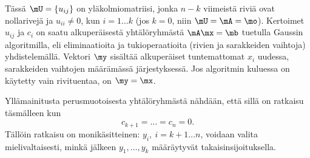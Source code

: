 Tässä $\mU=\{u_{ij}\}$ on yläkolmiomatriisi, jonka $n-k$ viimeistä riviä ovat nollarivejä ja 
$u_{ii} \neq 0$, kun $i=1 \ldots k$ (jos $k=0$, niin $\mU=\mA=\mo$). Kertoimet $u_{ij}$ ja $c_i$
on saatu alkuperäisestä  yhtälöryhmästä $\mA \mx = \mb$ tuetulla Gaussin algoritmilla, eli 
eliminaatioita ja tukioperaatioita (rivien ja sarakkeiden vaihtoja) yhdistelemällä. Vektori 
$\my$ sisältää alkuperäiset tuntemattomat $x_i$ uudessa, sarakkeiden vaihtojen määrämässä 
järjestyksessä. Jos algoritmin kuluessa on käytetty vain rivituentaa, on $\my = \mx$.

Yllämainitusta perusmuotoisesta yhtälöryhmästä nähdään, että sillä on ratkaisu täsmälleen kun
\[
c_{k+1}= \ldots = c_n = 0.
\]
Tällöin ratkaisu on monikäsitteinen: $y_i, \ i= k+1 \ldots n$, voidaan valita mielivaltaisesti,
minkä jälkeen $y_1, \ldots, y_k$ määräytyvät takaisinsijoituksella.
